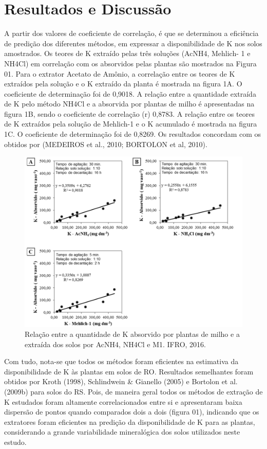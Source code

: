 \documentclass[article,12pt,onesidea,4paper,english,brazil]{abntex2}
\begin{document}
	\section*{Resultados e Discussão}
	
	A partir dos valores de coeficiente de correlação, é que se determinou a eficiência de predição dos diferentes métodos, em expressar a disponibilidade de K nos solos amostrados. Os teores de K extraído pelas três soluções (AcNH4, Mehlich- 1 e NH4Cl) em correlação com os absorvidos pelas plantas são mostrados na Figura 01.
	Para o extrator Acetato de Amônio, a correlação entre os teores de K extraídos pela solução e o K extraído da planta é mostrada na figura 1A. O coeficiente de determinação foi de 0,9018.
	A relação entre a quantidade extraída de K pelo método NH4Cl e a absorvida por plantas de milho é apresentadas na figura 1B, sendo o coeficiente de correlação
	(r) 0,8783. A relação entre os teores de K extraídos pela solução de Mehlich-1 e o K acumulado é mostrada na figura 1C. O coeficiente de determinação foi de 0,8269. Os resultados concordam com os obtidos por (MEDEIROS et al., 2010; BORTOLON
	et al, 2010).
	
		\begin{figure}[h]
		\centering
		\includegraphics[width=0.7\linewidth]{pip15.png}
		\caption{Relação entre a quantidade de K absorvido por plantas de milho e a extraída dos solos por AcNH4, NH4Cl e M1. IFRO, 2016.}
	\end{figure}
	
	Com tudo, nota-se que todos os métodos foram eficientes na estimativa da disponibilidade de K às plantas em solos de RO. Resultados semelhantes foram obtidos por Kroth (1998), Schlindwein \& Gianello (2005) e Bortolon et al. (2009b) para solos do RS.
	Pois, de maneira geral todos os métodos de extração de K estudados foram altamente correlacionados entre si e apresentaram baixa dispersão de pontos quando comparados dois a dois (figura 01), indicando que os extratores foram eficientes na predição da disponibilidade de K para as plantas, considerando a grande variabilidade mineralógica dos solos utilizados neste estudo.
	
\end{document}
